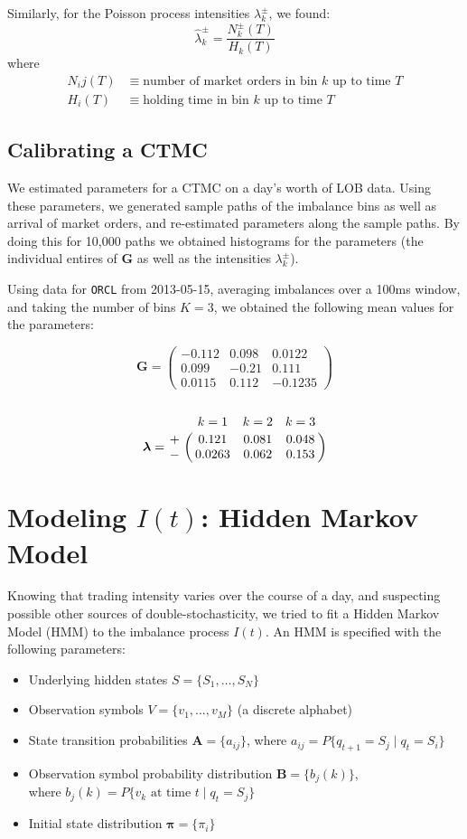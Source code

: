 \documentclass[12pt]{article}
\newcommand\mat[1]{\boldsymbol{#1}}
\begin{document}
Similarly, for the Poisson process intensities $\lambda_k^\pm$, we found:
$$ \hat{\lambda}_k^\pm = \dfrac{N_k^\pm(T)}{H_k(T)} $$
where
\begin{align*} 
N_ij(T) & \equiv \text{number of market orders in bin $k$ up to time $T$} \\
H_i(T) & \equiv \text{holding time in bin $k$ up to time $T$}
\end{align*}

\subsection*{Calibrating a CTMC}
We estimated parameters for a CTMC on a day's worth of LOB data.
Using these parameters, we generated sample paths of the imbalance bins as well as arrival of market orders,
and re-estimated parameters along the sample paths. By doing this for 10,000 paths we obtained histograms for
the parameters (the individual entires of $\mat{G}$ as well as the intensities $\lambda_k^\pm$). 

Using data for \texttt{ORCL} from 2013-05-15, averaging imbalances over a 100ms window, and taking the number
of bins $K=3$, we obtained the following mean values for the parameters:

$$ \mat{G} = \begin{pmatrix} -0.112 & 0.098 & 0.0122 \\
							0.099 & -0.21 & 0.111 \\
							0.0115 & 0.112 & -0.1235 \end{pmatrix}$$ \\
$$ \mat{\lambda} = \bordermatrix{  & k=1    & k=2   & k=3   \cr
								+ & 0.121  & 0.081 & 0.048 \cr
								- & 0.0263 & 0.062 & 0.153 } $$			

\section*{Modeling $I(t)$: Hidden Markov Model}
Knowing that trading intensity varies over the course of a day, and suspecting possible other sources
of double-stochasticity, we tried to fit a Hidden Markov Model (HMM) to the imbalance process $I(t)$.
An HMM is specified with the following parameters:
\begin{itemize}
\item Underlying hidden states $S = \lbrace S_1, \dots, S_N \rbrace$
\item Observation symbols $V = \lbrace v_1, \dots, v_M \rbrace$ (a discrete alphabet)
\item State transition probabilities $\mat{A} = \lbrace a_{ij} \rbrace$, where $a_{ij} = P \lbrace q_{t+1} = S_j \;| \; q_t = S_i \rbrace$
\item Observation symbol probability distribution $\mat{B} = \lbrace b_j (k) \rbrace$, \\
where $b_{j} (k) = P \lbrace v_k \mbox{ at time } t \; | \; q_t = S_j \rbrace$
\item Initial state distribution $\mat{\pi} = \lbrace \pi_i \rbrace$
\end{itemize}
\end{document}
